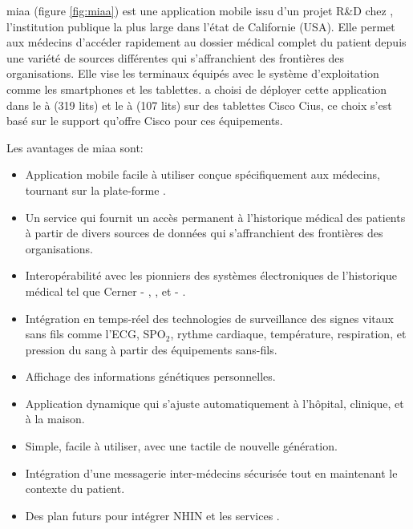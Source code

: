 \gls{miaa} (figure \ref{fig:miaa}) est une application mobile issu d'un
projet R\&D chez , l'institution publique la
plus large dans l'état de Californie (USA). Elle permet aux médecins
d'accéder rapidement au dossier médical complet du patient depuis une
variété de sources différentes qui s'affranchient des frontières des
organisations\cite{pph:eweek}. Elle vise les terminaux équipés avec le
système d'exploitation \android{} comme les smartphones et les
tablettes.  a choisi de déployer cette
application dans le  à  (319
lits) et le  à  (107 lits) sur des
tablettes Cisco Cius\cite{pph:tabtimes}, ce choix s'est basé sur le
support qu'offre Cisco pour ces équipements.

Les avantages de \gls{miaa} sont:~\cite{pph:yahoo}

\begin{itemize}

\item Application mobile facile à utiliser conçue spécifiquement aux
médecins, tournant sur la plate-forme \android{}.

\item Un service  qui fournit un accès permanent à
l'historique médical des patients à partir de divers sources de
données qui s'affranchient des frontières des organisations.

\item Interopérabilité avec les pionniers des systèmes électroniques
de l'historique médical tel que Cerner - ,
, et  - .

\item Intégration en temps-réel des technologies de surveillance
des signes vitaux sans fils comme l'ECG, SPO$_{2}$, rythme cardiaque,
température, respiration, et pression du sang à partir des équipements
sans-fils.

\item Affichage des informations génétiques personnelles.

\item Application dynamique qui s’ajuste automatiquement à l’hôpital, clinique, et à la maison.

\item Simple, facile à utiliser, avec une tactile de nouvelle génération.

\item Intégration d’une messagerie inter-médecins sécurisée tout en maintenant le contexte du patient.

\item Des plan futurs pour intégrer NHIN  et les services
.

\end{itemize}


